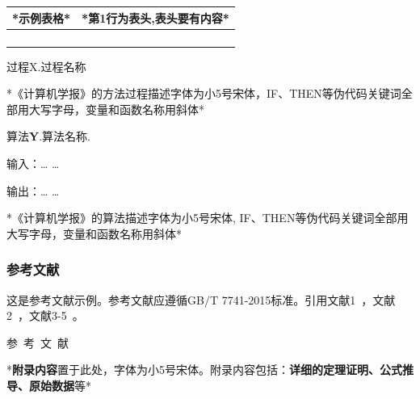 \documentclass[10.5pt,compsoc,UTF8]{CjC}
\theoremstyle{mystyle}
\begin{document}
\begin{multicols}{1}
\begin{table}[H]
\vspace {-2.5mm}
\begin{center}
\begin{tabular}{ll}
\toprule
*示例表格*&*第1行为表头,表头要有内容* \\
\hline
&
 \\
&
 \\
&
 \\
&
 \\
\bottomrule
\end{tabular}
\label{tab1}
\end{center}
\end{table}

{\heiti 过程X}.\quad 过程名称

{*《计算机学报》的方法过程描述字体为小5号宋体，IF、THEN等伪代码关键词全部用大写字母，变量和函数名称用斜体*}


{\heiti 算法\textbf{Y}}.\quad 算法名称.
{

\noindent 输入：{\ldots} {\ldots}

\noindent 输出：{\ldots} {\ldots}

*《计算机学报》的算法描述字体为小5号宋体, IF、THEN等伪代码关键词全部用大写字母，变量和函数名称用斜体*}

\subsubsection{参考文献}
这是参考文献示例。参考文献应遵循GB/T 7741-2015标准。引用文献1~\cite{Bohan1928}，文献2~\cite{chen1980zhongguo}，文献3-5~\cite{bravo1990comparative,niu2013zonghe,yuan2012lana}。

\vspace {3mm}

\vspace {5mm}
\centerline
{\textsf{参~考~文~献}}
 \addtolength{\itemsep}{-1em}
\vspace {1.5mm}



\end{multicols}

\begin{multicols}{1}

{\setlength\parindent{2em}
*\textbf{附录内容}置于此处，字体为小5号宋体。附录内容包括：\textbf{详细的定理证明、公式推导、原始数据}等*}\\\\

\end{multicols}
\end{document}
